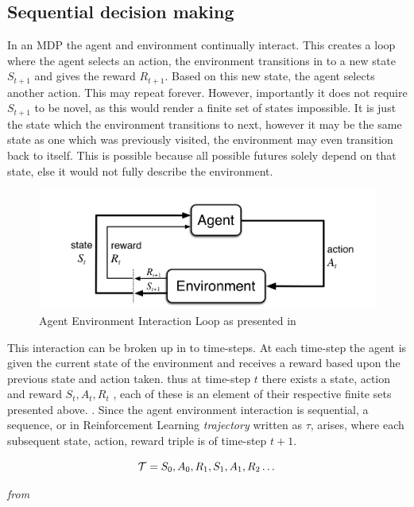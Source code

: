 \subsection{Sequential decision making}\label{subsec:sequential_decision_making}
In an MDP the agent and environment continually interact. This creates a loop where the agent selects an action, the environment transitions in to a new state $S_{t+1}$ and gives the reward $R_{t+1}$. Based on this new state, the agent selects another action. This may repeat forever. However, importantly it does not require $S_{t+1}$ to be novel, as this would render a finite set of states impossible. It is just the state which the environment transitions to next, however it may be the same state as one which was previously visited, the environment may even transition back to itself. This is possible because all possible futures solely depend on that state, else it would not fully describe the environment.

\begin{figure}[h!]
    \centering
    \includegraphics[width=0.7\linewidth]{figures/agent_environment_interaction_loop.png}
    \caption{Agent Environment Interaction Loop as presented in }
    \label{fig:agent_env_inter}
\end{figure}

\noindent
This interaction can be broken up in to time-steps. At each time-step the agent is given the current state of the environment and receives a reward based upon the previous state and action taken. thus at time-step $t$ there exists a state, action and reward $S_t, A_t, R_t$ , each of these is an element of their respective finite sets presented above. . Since the agent environment interaction is sequential, a sequence, or in Reinforcement Learning \textit{trajectory} written as $\tau$, arises, where each subsequent state, action, reward triple is of time-step $t+1$. 

\begin{equation}\label{MDP:trajectory}
    \mathcal{T} = S_0, A_0, R_1, S_1, A_1, R_2 \dots
\end{equation}
\centerline{\small\textit{from }}

